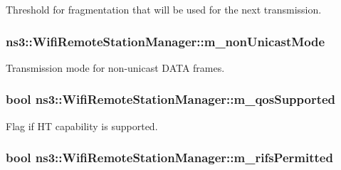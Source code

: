 Threshold for fragmentation that will be used for the next transmission. 

\subsubsection[{\texorpdfstring{m\+\_\+non\+Unicast\+Mode}{m_nonUnicastMode}}]{ ns3\+::\+Wifi\+Remote\+Station\+Manager\+::m\+\_\+non\+Unicast\+Mode\hspace{0.3cm}{\ttfamily [private]}}\hypertarget{classns3_1_1WifiRemoteStationManager_a713c2f64bf56c10372adef12988a2acf}{}\label{classns3_1_1WifiRemoteStationManager_a713c2f64bf56c10372adef12988a2acf}


Transmission mode for non-\/unicast D\+A\+TA frames. 

\subsubsection[{\texorpdfstring{m\+\_\+qos\+Supported}{m_qosSupported}}]{\setlength{\rightskip}{0pt plus 5cm}bool ns3\+::\+Wifi\+Remote\+Station\+Manager\+::m\+\_\+qos\+Supported\hspace{0.3cm}{\ttfamily [private]}}\hypertarget{classns3_1_1WifiRemoteStationManager_a508ff7784fe61e700fd4aad79ca9a187}{}\label{classns3_1_1WifiRemoteStationManager_a508ff7784fe61e700fd4aad79ca9a187}


Flag if HT capability is supported. 

\subsubsection[{\texorpdfstring{m\+\_\+rifs\+Permitted}{m_rifsPermitted}}]{\setlength{\rightskip}{0pt plus 5cm}bool ns3\+::\+Wifi\+Remote\+Station\+Manager\+::m\+\_\+rifs\+Permitted\hspace{0.3cm}{\ttfamily [private]}}\hypertarget{classns3_1_1WifiRemoteStationManager_aeed6724cf6898307008495f00a14279b}{}\label{classns3_1_1WifiRemoteStationManager_aeed6724cf6898307008495f00a14279b}



